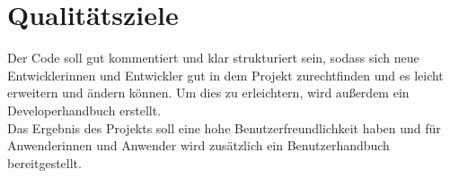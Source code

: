 \documentclass[a4paper,10pt]{scrartcl}
\begin{document}
\section{Qualitätsziele}

Der Code soll gut kommentiert und klar strukturiert sein, sodass sich neue Entwicklerinnen und Entwickler gut in dem Projekt zurechtfinden und es leicht erweitern und ändern können. Um dies zu erleichtern, wird außerdem ein Developerhandbuch erstellt.\\
Das Ergebnis des Projekts soll eine hohe Benutzerfreundlichkeit haben und für Anwenderinnen und Anwender wird zusätzlich ein Benutzerhandbuch bereitgestellt.
\end{document}

